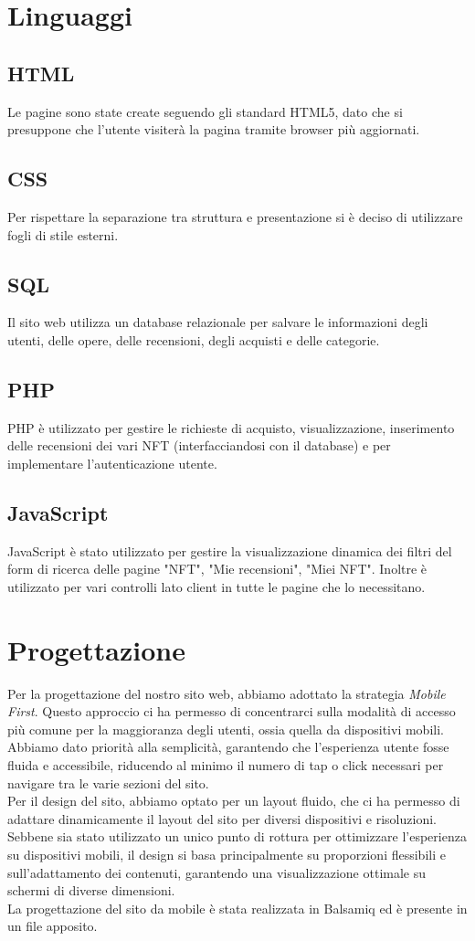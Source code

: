 \documentclass[10pt]{article}
\begin{document}
\section{Linguaggi}
\subsection{HTML}
Le pagine sono state create seguendo gli standard HTML5, dato che si presuppone che l'utente visiterà la pagina tramite browser più aggiornati.
\subsection{CSS}
Per rispettare la separazione tra struttura e presentazione si è deciso di utilizzare fogli di stile esterni.
\subsection{SQL}
Il sito web utilizza un database relazionale per salvare le informazioni degli utenti, delle opere, delle recensioni, degli acquisti e delle categorie.
\subsection{PHP} 
PHP è utilizzato per gestire le richieste di acquisto, visualizzazione, inserimento delle recensioni dei vari NFT (interfacciandosi con il database) e per implementare l'autenticazione utente.
\subsection{JavaScript}
JavaScript è stato utilizzato per gestire la visualizzazione dinamica dei filtri del form di ricerca delle pagine "NFT", "Mie recensioni", "Miei NFT".
Inoltre è utilizzato per vari controlli lato client in tutte le pagine che lo necessitano.

\section{Progettazione}
Per la progettazione del nostro sito web, abbiamo adottato la strategia \textit{Mobile First}. Questo approccio ci ha permesso di concentrarci sulla modalità di accesso più comune per la maggioranza degli utenti, ossia quella da dispositivi mobili. Abbiamo dato priorità alla semplicità, garantendo che l’esperienza utente fosse fluida e accessibile, riducendo al minimo il numero di tap o click necessari per navigare tra le varie sezioni del sito.\\
Per il design del sito, abbiamo optato per un layout fluido, che ci ha permesso di adattare dinamicamente il layout del sito per diversi dispositivi e risoluzioni. Sebbene sia stato utilizzato un unico punto di rottura per ottimizzare l’esperienza su dispositivi mobili, il design si basa principalmente su proporzioni flessibili e sull’adattamento dei contenuti, garantendo una visualizzazione ottimale su schermi di diverse dimensioni. \\
La progettazione del sito da mobile è stata realizzata in Balsamiq ed è presente in un file apposito.
\end{document}
